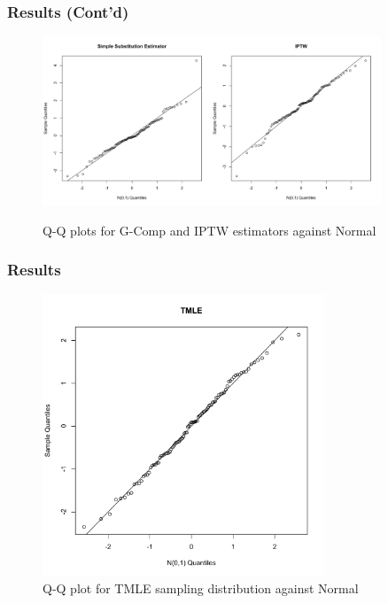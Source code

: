 \documentclass{beamer}
\begin{document}
\begin{frame}
\frametitle{Results (Cont'd)}
\begin{figure}
\centering
\includegraphics[width=0.45\textwidth]{simplesub_qqplot.pdf}\includegraphics[width=0.45\textwidth]{iptw_qqplot.pdf}
\caption{Q-Q plots for G-Comp and IPTW estimators against Normal}
\end{figure}
\end{frame}

\begin{frame}
\frametitle{Results}
\begin{figure}
\centering
\includegraphics[width=0.75\textwidth]{tmle_qqplot.pdf}
\caption{Q-Q plot for TMLE sampling distribution against Normal}
\end{figure}
\end{frame}
\end{document}
